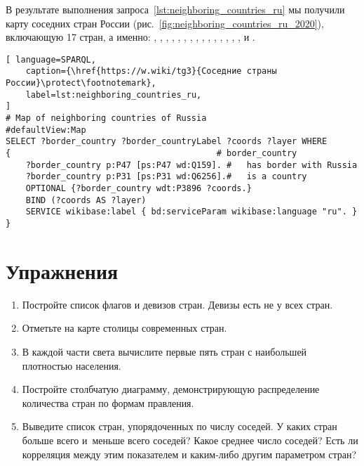 В результате выполнения запроса~\ref{lst:neighboring_countries_ru} мы получили 
карту соседних стран России 
(рис.~\ref{fig:neighboring_countries_ru_2020}), включающую 17 стран, а именно: 
, , , , , , , , , , , , , , ,  и .


\begin{lstlisting}[ language=SPARQL, 
    caption={\href{https://w.wiki/tg3}{Соседние страны России}\protect\footnotemark},
    label=lst:neighboring_countries_ru, 
]
# Map of neighboring countries of Russia
#defaultView:Map
SELECT ?border_country ?border_countryLabel ?coords ?layer WHERE 
{                                         # border_country
	?border_country p:P47 [ps:P47 wd:Q159]. #   has border with Russia
	?border_country p:P31 [ps:P31 wd:Q6256].#   is a country
	OPTIONAL {?border_country wdt:P3896 ?coords.}
	BIND (?coords AS ?layer)
	SERVICE wikibase:label { bd:serviceParam wikibase:language "ru". }
}
\end{lstlisting}


\section{Упражнения}

\begin{enumerate}[noitemsep,topsep=0pt]
	\item Постройте список флагов и девизов стран. Девизы есть не у всех стран.
	\item Отметьте на карте столицы современных стран.
	\item В каждой части света вычислите первые пять стран с наибольшей плотностью населения.
	\item Постройте столбчатую диаграмму, демонстрирующую распределение количества стран по формам правления.
	\item Выведите список стран, упорядоченных по числу соседей. 
        У каких стран больше всего и~меньше всего соседей? Какое среднее число соседей? 
        Есть ли корреляция между этим показателем и каким-либо другим параметром стран?
\end{enumerate}
